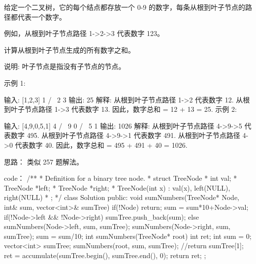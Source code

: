 给定一个二叉树，它的每个结点都存放一个 0-9 的数字，每条从根到叶子节点的路径都代表一个数字。

例如，从根到叶子节点路径 1->2->3 代表数字 123。

计算从根到叶子节点生成的所有数字之和。

说明: 叶子节点是指没有子节点的节点。

示例 1:

输入: [1,2,3]
    1
   / \
  2   3
输出: 25
解释:
从根到叶子节点路径 1->2 代表数字 12.
从根到叶子节点路径 1->3 代表数字 13.
因此，数字总和 = 12 + 13 = 25.
示例 2:

输入: [4,9,0,5,1]
    4
   / \
  9   0
 / \
5   1
输出: 1026
解释:
从根到叶子节点路径 4->9->5 代表数字 495.
从根到叶子节点路径 4->9->1 代表数字 491.
从根到叶子节点路径 4->0 代表数字 40.
因此，数字总和 = 495 + 491 + 40 = 1026.

























思路：
类似 257 题解法。


























code：
/**
 * Definition for a binary tree node.
 * struct TreeNode {
 *     int val;
 *     TreeNode *left;
 *     TreeNode *right;
 *     TreeNode(int x) : val(x), left(NULL), right(NULL) {}
 * };
 */
class Solution {
public:
    void sumNumbers(TreeNode* Node, int& sum, vector<int>& sumTree)
    {
        if(!Node) return;
        sum = sum*10+Node->val;
        if(!Node->left && !Node->right) sumTree.push_back(sum);
        else
        {
            sumNumbers(Node->left, sum, sumTree);
            sumNumbers(Node->right, sum, sumTree);
        }
        sum = sum/10;
    }
    int sumNumbers(TreeNode* root) {
        int ret;
        int sum = 0;
        vector<int> sumTree;
        sumNumbers(root, sum, sumTree);
        //return sumTree[1];
        ret = accumulate(sumTree.begin(), sumTree.end(), 0);
        return ret;
    }
};